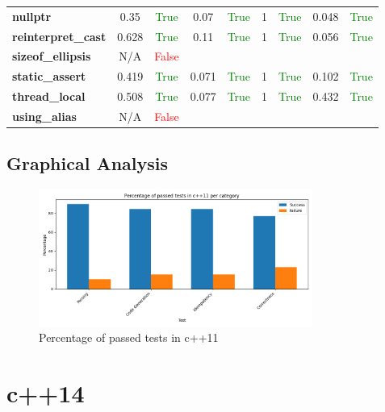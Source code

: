 \documentclass{article}
\begin{document}
\begin{xltabular}{\textwidth}{lcccccccc}
\textbf{{\fontsize{10}{12}\selectfont nullptr}}& 0.35&\textcolor{green}{True}& 0.07&\textcolor{green}{True}& 1&\textcolor{green}{True}& 0.048&\textcolor{green}{True} \\[0.5ex]
\textbf{{\fontsize{10}{12}\selectfont reinterpret\_cast}}& 0.628&\textcolor{green}{True}& 0.11&\textcolor{green}{True}& 1&\textcolor{green}{True}& 0.056&\textcolor{green}{True} \\[0.5ex]
\textbf{{\fontsize{10}{12}\selectfont sizeof\_ellipsis}}& N/A&\textcolor{red}{False} \\[0.5ex]
\textbf{{\fontsize{10}{12}\selectfont static\_assert}}& 0.419&\textcolor{green}{True}& 0.071&\textcolor{green}{True}& 1&\textcolor{green}{True}& 0.102&\textcolor{green}{True} \\[0.5ex]
\textbf{{\fontsize{10}{12}\selectfont thread\_local}}& 0.508&\textcolor{green}{True}& 0.077&\textcolor{green}{True}& 1&\textcolor{green}{True}& 0.432&\textcolor{green}{True} \\[0.5ex]
\textbf{{\fontsize{10}{12}\selectfont using\_alias}}& N/A&\textcolor{red}{False} \\[0.5ex]
\bottomrule
\end{xltabular}
\newpage
\subsection{Graphical Analysis}
\begin{figure}[h!]
\centering
\includegraphics[width=0.8\textwidth]{../reports/clava/images/c++11_percentage.png}
\caption{Percentage of passed tests in c++11}
\label{fig:c++11_percentage}
\end{figure}
\newpage
\section{c++14}
\end{document}
